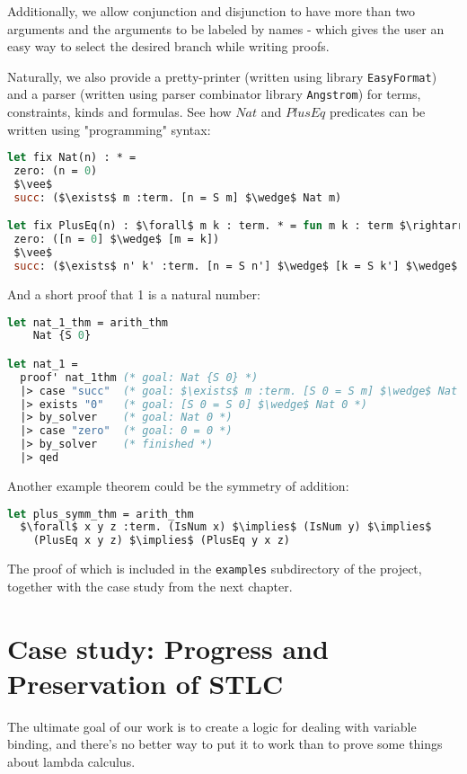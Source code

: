 \documentclass[english, mgr]{iithesis}
\renewcommand{\tt}[1]{\texttt{\small{#1}}}
\begin{document}
Additionally, we allow conjunction and disjunction to have more than two arguments
and the  arguments to be labeled by names
- which gives the user an easy way to select the desired branch while writing proofs.

Naturally, we also provide a pretty-printer (written using library \texttt{EasyFormat})
and a parser (written using parser combinator library \texttt{Angstrom})
for terms, constraints, kinds and formulas.
See how $Nat$ and $PlusEq$ predicates can be written using "programming" syntax:
\begin{lstlisting}[mathescape, language=OCaml]
let fix Nat(n) : * =
 zero: (n = 0)
 $\vee$
 succ: ($\exists$ m :term. [n = S m] $\wedge$ Nat m)

let fix PlusEq(n) : $\forall$ m k : term. * = fun m k : term $\rightarrow$
 zero: ([n = 0] $\wedge$ [m = k])
 $\vee$
 succ: ($\exists$ n' k' :term. [n = S n'] $\wedge$ [k = S k'] $\wedge$ PlusEq n' m k')
\end{lstlisting}
And a short proof that 1 is a natural number:
\begin{lstlisting}[mathescape, language=OCaml]
let nat_1_thm = arith_thm
    Nat {S 0}

let nat_1 =
  proof' nat_1thm (* goal: Nat {S 0} *)
  |> case "succ"  (* goal: $\exists$ m :term. [S 0 = S m] $\wedge$ Nat m *)
  |> exists "0"   (* goal: [S 0 = S 0] $\wedge$ Nat 0 *)
  |> by_solver    (* goal: Nat 0 *)
  |> case "zero"  (* goal: 0 = 0 *)
  |> by_solver    (* finished *)
  |> qed
\end{lstlisting}
Another example theorem could be the symmetry of addition:
\begin{lstlisting}[mathescape, language=OCaml]
let plus_symm_thm = arith_thm
  $\forall$ x y z :term. (IsNum x) $\implies$ (IsNum y) $\implies$
    (PlusEq x y z) $\implies$ (PlusEq y x z)
\end{lstlisting}
The proof of which is included in the \tt{examples} subdirectory of the project,
together with the case study from the next chapter.
\chapter{Case study: Progress and Preservation of STLC}

The ultimate goal of our work is to create a logic for dealing with variable binding,
and there's no better way to put it to work than to prove some things about lambda calculus.
\end{document}
